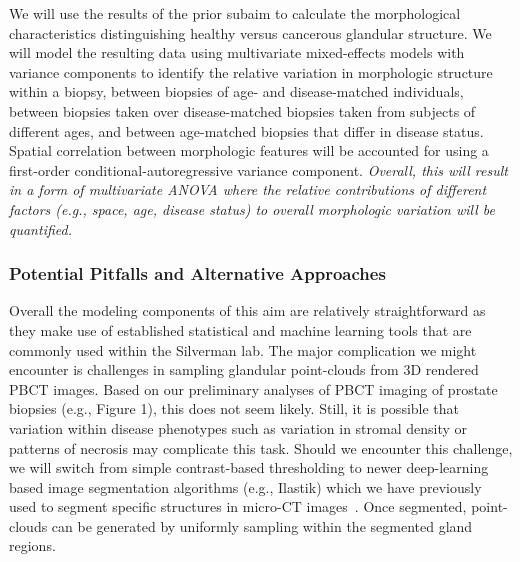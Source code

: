 \documentclass{NIHGrant}
\theoremstyle{theorem}
\begin{document}
We will use the results of the prior subaim to calculate the morphological characteristics distinguishing healthy versus cancerous glandular structure. We will model the resulting data using multivariate mixed-effects models with variance components to identify the relative variation in morphologic structure within a biopsy, between biopsies of age- and disease-matched individuals, between biopsies taken over disease-matched biopsies taken from subjects of different ages, and between age-matched biopsies that differ in disease status. Spatial correlation between morphologic features will be accounted for using a first-order conditional-autoregressive variance component. \emph{Overall, this will result in a form of multivariate ANOVA where the relative contributions of different factors (e.g., space, age, disease status) to overall morphologic variation will be quantified.}

\subsubsection*{Potential Pitfalls and Alternative Approaches} \label{aim3-pitfalls}
Overall the modeling components of this aim are relatively straightforward as they make use of established statistical and machine learning tools that are commonly used within the Silverman lab. The major complication we might encounter is challenges in sampling glandular point-clouds from 3D rendered PBCT images. Based on our preliminary analyses of PBCT imaging of prostate biopsies (e.g., Figure 1), this does not seem likely. Still, it is possible that variation within disease phenotypes such as variation in stromal density or patterns of necrosis may complicate this task. Should we encounter this challenge, we will switch from simple contrast-based thresholding to newer deep-learning based image segmentation algorithms (e.g., Ilastik) which we have previously used to segment specific structures in micro-CT images~\cite{yakovlev_quantitative_2023}. Once segmented, point-clouds can be generated by uniformly sampling within the segmented gland regions.
\end{document}
